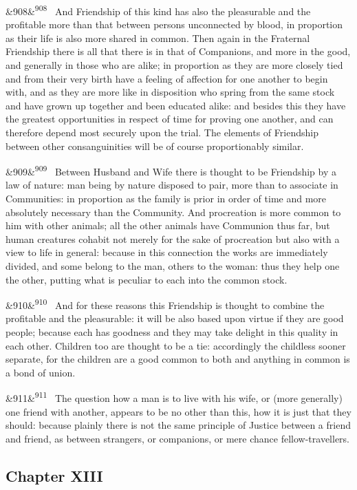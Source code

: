 \documentclass[12pt]{article}
\newcommand{\para}[1][]{\par\noindent\ifx&#1&\else\textsuperscript{\footnotesize #1}~\fi}
\begin{document}
\para[908] And Friendship of this kind has also the pleasurable and the profitable more than that between persons unconnected by blood, in proportion as their life is also more shared in common. Then again in the Fraternal Friendship there is all that there is in that of Companions, and more in the good, and generally in those who are alike; in proportion as they are more closely tied and from their very birth have a feeling of affection for one another to begin with, and as they are more like in disposition who spring from the same stock and have grown up together and been educated alike: and besides this they have the greatest opportunities in respect of time for proving one another, and can therefore depend most securely upon the trial. The elements of Friendship between other consanguinities will be of course proportionably similar.

\para[909] Between Husband and Wife there is thought to be Friendship by a law of nature: man being by nature disposed to pair, more than to associate in Communities: in proportion as the family is prior in order of time and more absolutely necessary than the Community. And procreation is more common to him with other animals; all the other animals have Communion thus far, but human creatures cohabit not merely for the sake of procreation but also with a view to life in general: because in this connection the works are immediately divided, and some belong to the man, others to the woman: thus they help one the other, putting what is peculiar to each into the common stock.

\para[910] And for these reasons this Friendship is thought to combine the profitable and the pleasurable: it will be also based upon virtue if they are good people; because each has goodness and they may take delight in this quality in each other. Children too are thought to be a tie: accordingly the childless sooner separate, for the children are a good common to both and anything in common is a bond of union.

\para[911] The question how a man is to live with his wife, or (more generally) one friend with another, appears to be no other than this, how it is just that they should: because plainly there is not the same principle of Justice between a friend and friend, as between strangers, or companions, or mere chance fellow-travellers.

\subsection*{Chapter XIII}
\end{document}
